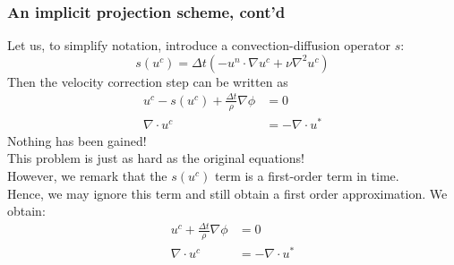 \begin{frame}
\frametitle{An implicit projection scheme, cont'd}
Let us, to simplify notation, introduce
a convection-diffusion operator $s$: 
\[
s(u^c) =   \Delta t (-u^n \cdot \nabla u^c +  \nu \nabla^2 u^c)  
\]
Then the velocity correction step can be written as 
\begin{align*}
u^c - s(u^c) + \frac{\Delta t}{\rho} \nabla \phi &= 0 \\ 
\nabla \cdot u^c &= -\nabla \cdot u^* 
\end{align*}
\alert{Nothing has been gained!} \\
This problem is just as hard as the original equations! \\
However, we remark that the $s(u^c)$ term is a first-order term in time.\\ 
Hence, we may ignore this term and still obtain a first order approximation. 
We obtain: 
\begin{align*}
u^c + \frac{\Delta t}{\rho} \nabla \phi &= 0 \\ 
\nabla \cdot u^c &= -\nabla \cdot u^* 
\end{align*}
\end{frame}

